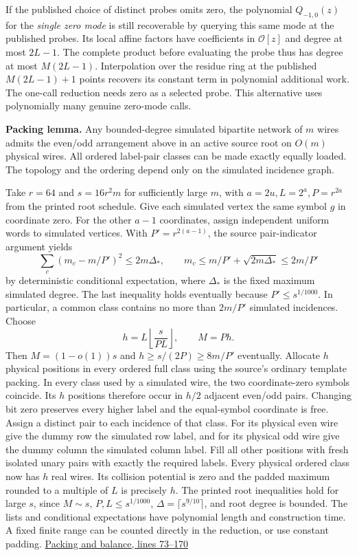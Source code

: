\documentclass[
  11pt,
]{article}
\begin{document}
If the published choice of distinct probes omits zero, the polynomial
\(Q_{-1,0}(z)\) for the \emph{single zero mode} is still recoverable by
querying this same mode at the published probes. Its local affine
factors have coefficients in \(\mathcal O[z]\) and degree at most
\(2L-1\). The complete product before evaluating the probe thus has
degree at most \(M(2L-1)\). Interpolation over the residue ring at the
published \(M(2L-1)+1\) points recovers its constant term in polynomial
additional work. The one-call reduction needs zero as a selected probe.
This alternative uses polynomially many genuine zero-mode calls.

\textbf{Packing lemma.} Any bounded-degree simulated bipartite network
of \(m\) wires admits the even/odd arrangement above in an active source
root on \(O(m)\) physical wires. All ordered label-pair classes can be
made exactly equally loaded. The topology and the ordering depend only
on the simulated incidence graph.

Take \(r=64\) and \(s=16r^2m\) for sufficiently large \(m\), with
\(a=2u,L=2^a,P=r^{2a}\) from the printed root schedule. Give each
simulated vertex the same symbol \(g\) in coordinate zero. For the other
\(a-1\) coordinates, assign independent uniform words to simulated
vertices. With \(P'=r^{2(a-1)}\), the source pair-indicator argument
yields \[
       \sum_c (m_c-m/P')^2\le 2m\Delta_*,\qquad
       m_c\le m/P'+\sqrt{2m\Delta_*}\le2m/P'
\tag{A2}
\] by deterministic conditional expectation, where \(\Delta_*\) is the
fixed maximum simulated degree. The last inequality holds eventually
because \(P'\le s^{1/1000}\). In particular, a common class contains no
more than \(2m/P'\) simulated incidences. Choose \[
       h=L\left\lfloor\frac{s}{PL}\right\rfloor,\qquad M=Ph .
\] Then \(M=(1-o(1))s\) and \(h\ge s/(2P)\ge8m/P'\) eventually. Allocate
\(h\) physical positions in every ordered full class using the source's
ordinary template packing. In every class used by a simulated wire, the
two coordinate-zero symbols coincide. Its \(h\) positions therefore
occur in \(h/2\) adjacent even/odd pairs. Changing bit zero preserves
every higher label and the equal-symbol coordinate is free. Assign a
distinct pair to each incidence of that class. For its physical even
wire give the dummy row the simulated row label, and for its physical
odd wire give the dummy column the simulated column label. Fill all
other positions with fresh isolated unary pairs with exactly the
required labels. Every physical ordered class now has \(h\) real wires.
Its collision potential is zero and the padded maximum rounded to a
multiple of \(L\) is precisely \(h\). The printed root inequalities hold
for large \(s\), since \(M\sim s\), \(P,L\le s^{1/1000}\),
\(\Delta=\lceil s^{9/10}\rceil\), and root degree is bounded. The lists
and conditional expectations have polynomial length and construction
time. A fixed finite range can be counted directly in the reduction, or
use constant padding.
\href{https://github.com/openai/math/blob/main/preprints/The-Exponential-Time-Hypothesis-is-False-October-25-2026/build/quantitative-contraction.tex\#L73}{Packing
and balance, lines 73--170}
\end{document}

